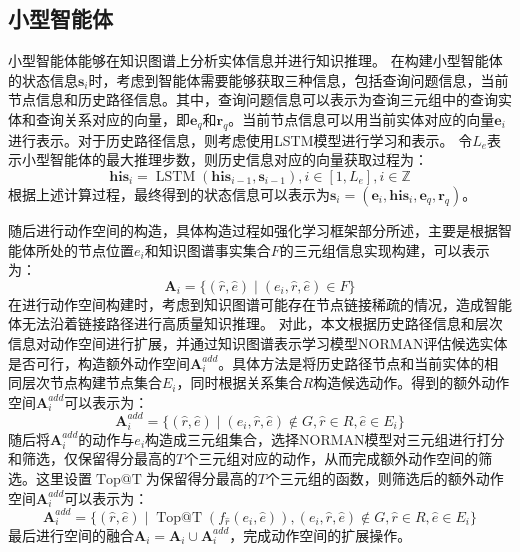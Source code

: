 \documentclass[algorithmlist, AutoFakeBold, AutoFakeSlant, figurelist, tablelist, nomlist, engineering]{seuthesix}
\begin{document}
\subsection{小型智能体}
小型智能体能够在知识图谱上分析实体信息并进行知识推理。
在构建小型智能体的状态信息$\bm{s}_i$时，考虑到智能体需要能够获取三种信息，包括查询问题信息，当前节点信息和历史路径信息。其中，查询问题信息可以表示为查询三元组中的查询实体和查询关系对应的向量，即$\bm{e}_q$和$\bm{r}_q$。当前节点信息可以用当前实体对应的向量$\bm{e}_i$进行表示。对于历史路径信息，则考虑使用LSTM模型进行学习和表示。
令$L_e$表示小型智能体的最大推理步数，则历史信息对应的向量获取过程为：
\begin{equation}
  \bm{his}_i=\operatorname{LSTM}\left(\bm{his}_{i - 1}, \bm{s}_{i - 1}\right), i \in [1, L_e], i \in \mathbb{Z}
  \label{equation_HistoryLSTM}
\end{equation}
根据上述计算过程，最终得到的状态信息可以表示为$\bm{s}_i = (\bm{e}_i, \bm{his}_i, \bm{e}_q, \bm{r}_q)$。

随后进行动作空间的构造，具体构造过程如强化学习框架部分所述，主要是根据智能体所处的节点位置$e_i$和知识图谱事实集合$F$的三元组信息实现构建，可以表示为：
\begin{equation}
  \bm{A}_i = \{(\hat{r}, \hat{e}) \mid (e_i, \hat{r}, \hat{e}) \in F\}
  \label{base_1}
\end{equation}
在进行动作空间构建时，考虑到知识图谱可能存在节点链接稀疏的情况，造成智能体无法沿着链接路径进行高质量知识推理。
对此，本文根据历史路径信息和层次信息对动作空间进行扩展，并通过知识图谱表示学习模型NORMAN评估候选实体是否可行，构造额外动作空间$\bm{A}_{i}^{add}$。具体方法是将历史路径节点和当前实体的相同层次节点构建节点集合$E_i$，同时根据关系集合$R$构造候选动作。得到的额外动作空间$\bm{A}_{i}^{add}$可以表示为：
\begin{equation}
  \bm{A}_{i}^{add} = \{(\hat{r}, \hat{e}) \mid (e_i, \hat{r}, \hat{e}) \notin G, \hat{r} \in R, \hat{e} \in E_i \}
  \label{extra_1}
\end{equation}
随后将$\bm{A}_{i}^{add}$的动作与$e_i$构造成三元组集合，选择NORMAN模型对三元组进行打分和筛选，仅保留得分最高的$T$个三元组对应的动作，从而完成额外动作空间的筛选。这里设置$\operatorname{Top@T}$为保留得分最高的$T$个三元组的函数，则筛选后的额外动作空间$\bm{A}_{i}^{add}$可以表示为：
\begin{equation}
  \bm{A}_i^{add} = \{(\hat{r}, \hat{e}) \mid \operatorname{Top@T}(f_{\hat{r}}(e_i, \hat{e})), (e_i, \hat{r}, \hat{e}) \notin G, \hat{r} \in R, \hat{e} \in E_i \}
\end{equation}
最后进行空间的融合$\bm{A}_i = \bm{A}_i \cup \bm{A}_{i}^{add} $，完成动作空间的扩展操作。
\end{document}
